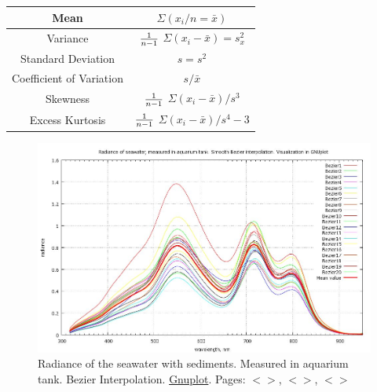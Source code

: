 \documentclass[11pt]{article}
\begin{document}
\begin{appendices}
\begin{table}[htbp]
\begin{center}
\begin{tabular}{|c|c|}
		\vspace{1ex}

		Mean & $\Sigma(x_i/n=\bar x)$ \\ \hline
		Variance & $1 \over n-1$ $\Sigma(x_i-\bar x)=s^2_x$  \\ \hline
		Standard Deviation & $s=s^2$ \\ \hline
		Coefficient of Variation & $s/\bar x$ \\ \hline
		Skewness & $1 \over n-1$ $\Sigma(x_i-\bar x)/s^3$  \\ \hline
		Excess Kurtosis & $1 \over n-1$ $\Sigma(x_i-\bar x)/s^4-3$  \\ \hline
	\end{tabular}
	\end{center}
	\label{tab:19}
\end{table}

\begin{figure}[H]
	\centering
	\includegraphics[scale=0.35]{GNU-Radiance_Bezier.jpg}
	\caption{Radiance of the seawater with sediments. Measured in aquarium tank. Bezier Interpolation. \href{http://www.gnuplot.info/}{Gnuplot}. Pages: $<$\pageref{dataprep}$>$, $<$\pageref{page-40}$>$, $<$\pageref{page-30}$>$}
	\label{fig:A.16}
\end{figure}


\end{appendices}
\end{document}
